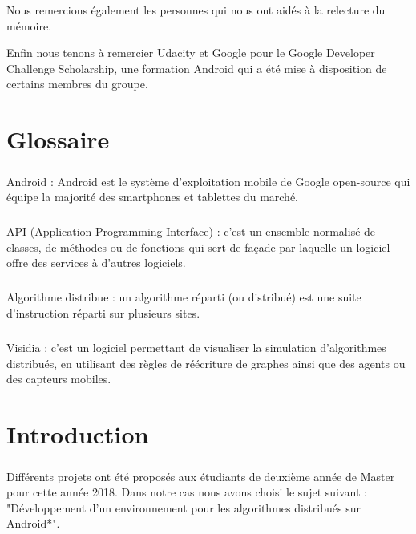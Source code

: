 \documentclass[a4paper,10pt]{report}
\begin{document}
Nous remercions également les personnes qui nous ont aidés à la relecture du mémoire.

Enfin nous tenons à remercier Udacity et Google pour le Google Developer Challenge Scholarship, une formation Android qui a été mise à disposition de certains membres du groupe.
\begin{changemargin}
\tableofcontents
\end{changemargin}
\chapter*{Glossaire}
\paragraph{}
Android : Android est le système d'exploitation mobile de Google open-source qui équipe la majorité des smartphones et tablettes du marché.
\paragraph{}
API (Application Programming Interface) : c'est un ensemble normalisé de classes, de méthodes ou de fonctions qui sert de façade par laquelle un logiciel offre des services à d'autres logiciels.
\paragraph{}
Algorithme distribue : un algorithme réparti (ou distribué) est une suite d'instruction réparti sur plusieurs sites.
\paragraph{}
Visidia : c'est un logiciel permettant de visualiser la simulation d'algorithmes distribués, en utilisant des règles de réécriture de graphes ainsi que des agents ou des capteurs mobiles. 

\chapter{Introduction}
\sloppy
  \paragraph{}
  Différents projets ont été proposés aux étudiants de deuxième année de Master pour cette année 2018. Dans notre cas nous avons choisi le sujet suivant : "Développement d’un environnement pour les algorithmes distribués sur Android*".
\end{document}
